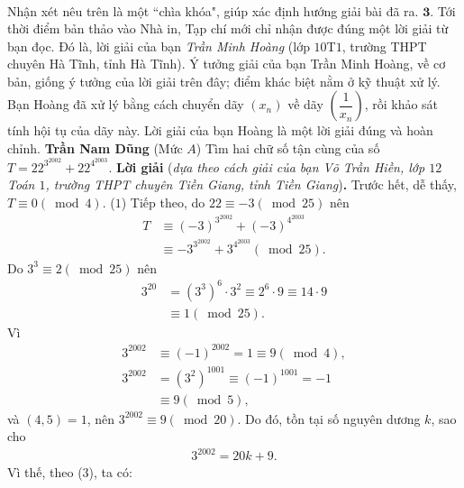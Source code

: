 \begin{multicols}{2}
\begin{align*}
	\end{align*}
	Nhận xét nêu trên là một ``chìa khóa", giúp xác định hướng giải bài đã ra.
	\vskip 0.05cm
	$\pmb{3.}$ Tới thời điểm bản thảo vào Nhà in, Tạp chí mới chỉ nhận được đúng một lời giải từ bạn đọc. Đó là, lời giải của bạn \textit{Trần Minh Hoàng} (lớp $10$T$1$, trường THPT chuyên Hà Tĩnh, tỉnh Hà Tĩnh). Ý tưởng giải của bạn Trần Minh Hoàng, về cơ bản, giống ý tưởng của lời giải trên đây; điểm khác biệt nằm ở kỹ thuật xử lý. Bạn Hoàng đã xử lý bằng cách chuyển dãy $(x_n)$  về dãy  $\left(\dfrac{1}{x_n}\right)$, rồi khảo sát tính hội tụ của dãy này. Lời giải của bạn Hoàng là một lời giải đúng và hoàn chỉnh.
	\vskip 0.05cm
	\hfill	\textbf{\color{thachthuctoanhoc}Trần Nam Dũng}
	\vskip 0.05cm
	{}
	(Mức $A$) Tìm hai chữ số tận cùng của số $T=22^{3^{2002}}+22^{4^{2003}}$.
	\vskip 0.05cm
	\textbf{\color{thachthuctoanhoc}Lời giải} (\textit{dựa theo cách giải của bạn Võ Trần Hiền, lớp $12$ Toán $1$, trường THPT chuyên Tiền Giang, tỉnh Tiền Giang})\textbf{\color{thachthuctoanhoc}.}
	\vskip 0.05cm
	Trước hết, dễ thấy, $T \equiv 0\left( {\bmod 4} \right)$. \hfill ($1$)
	\vskip 0.05cm
	Tiếp theo, do  $22 \equiv  - 3\left( {\bmod 25} \right)$ nên
	\begin{align*}
		T &\equiv {\left( { - 3} \right)^{{3^{2002}}}} + {\left( { - 3} \right)^{{4^{2003}}}} \\
		&\equiv  - {3^{{3^{2002}}}} + {3^{{4^{2003}}}}\left( {\bmod 25} \right). \tag{$2$}
	\end{align*}
	Do  ${3^3} \equiv 2\left( {\bmod 25} \right)$ nên
	\begin{align*}
		{3^{20}} &= {\left( {{3^3}} \right)^6} \cdot {3^2} \equiv {2^6} \cdot 9 \equiv 14 \cdot 9 \\
		&\equiv 1\left( {\bmod 25} \right). \tag{$3$}
	\end{align*}
	Vì
	\begin{align*}
		{3^{2002}} &\equiv {\left( { - 1} \right)^{2002}} = 1 \equiv 9\left( {\bmod 4} \right),\\
		{3^{2002}} &= {\left( {{3^2}} \right)^{1001}} \equiv {\left( { - 1} \right)^{1001}} =  - 1 \\
		&\equiv 9\left( {\bmod 5} \right),
	\end{align*}
	và $(4, 5) = 1$, nên ${3^{2002}} \equiv 9\left( {\bmod 20} \right)$.  Do đó, tồn tại số nguyên dương $k$, sao cho
	\begin{align*}
		{3^{2002}} = 20k + 9.
	\end{align*}
	Vì thế, theo ($3$), ta có:

\end{multicols}
